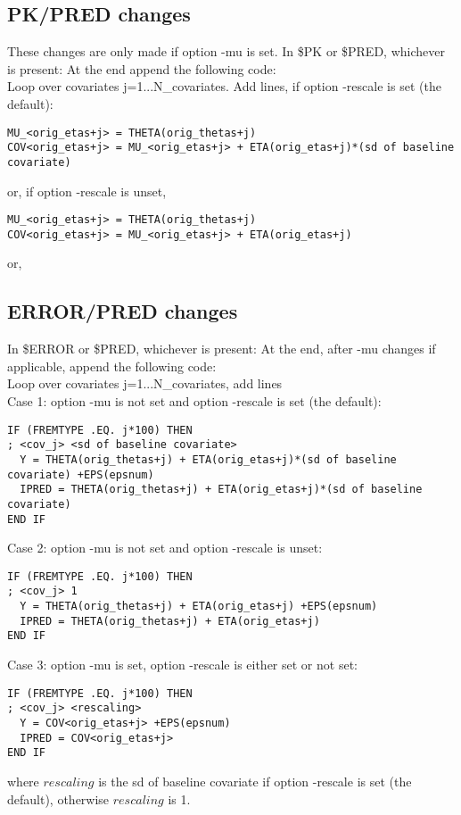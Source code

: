 \subsection{PK/PRED changes}
These changes are only made if option -mu is set.
In \$PK or \$PRED, whichever is present:
At the end append the following code: \\
Loop over covariates j=1...N\_covariates. %
Add lines, if option -rescale is set (the default):
\begin{verbatim}
MU_<orig_etas+j> = THETA(orig_thetas+j)
COV<orig_etas+j> = MU_<orig_etas+j> + ETA(orig_etas+j)*(sd of baseline covariate)
\end{verbatim}
or, if option -rescale is unset,
\begin{verbatim}
MU_<orig_etas+j> = THETA(orig_thetas+j)
COV<orig_etas+j> = MU_<orig_etas+j> + ETA(orig_etas+j)
\end{verbatim}
or,
\subsection{ERROR/PRED changes}
In \$ERROR or \$PRED, whichever is present:
At the end, after -mu changes if applicable, append the following code: \\
Loop over covariates j=1...N\_covariates, %
add lines\\
Case 1: option -mu is not set and option -rescale is set (the default):\\
\begin{verbatim}
IF (FREMTYPE .EQ. j*100) THEN
; <cov_j> <sd of baseline covariate>
  Y = THETA(orig_thetas+j) + ETA(orig_etas+j)*(sd of baseline covariate) +EPS(epsnum)
  IPRED = THETA(orig_thetas+j) + ETA(orig_etas+j)*(sd of baseline covariate)
END IF
\end{verbatim}

\noindent Case 2: option -mu is not set and option -rescale is unset:\\
\begin{verbatim}
IF (FREMTYPE .EQ. j*100) THEN
; <cov_j> 1
  Y = THETA(orig_thetas+j) + ETA(orig_etas+j) +EPS(epsnum)
  IPRED = THETA(orig_thetas+j) + ETA(orig_etas+j)
END IF
\end{verbatim}


\noindent Case 3: option -mu is set, option -rescale is either set or not set:\\
\begin{verbatim}
IF (FREMTYPE .EQ. j*100) THEN
; <cov_j> <rescaling>
  Y = COV<orig_etas+j> +EPS(epsnum)
  IPRED = COV<orig_etas+j>
END IF
\end{verbatim}
where $rescaling$ is the sd of baseline covariate if option -rescale is set (the default), otherwise $rescaling$ is 1.

